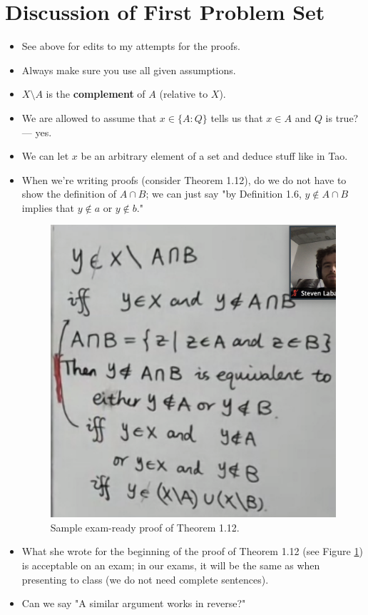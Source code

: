 \documentclass[titlepage]{article}
\theoremstyle{definition}
\begin{document}
\section{Discussion of First Problem Set}
\begin{itemize}
    \item {}See above for edits to my attempts for the proofs.
    \item Always make sure you use all given assumptions.
    \item $X\setminus A$ is the \textbf{complement} of $A$ (relative to $X$).
    \item We are allowed to assume that $x\in\{A:Q\}$ tells us that $x\in A$ and $Q$ is true? --- yes.
    \item We can let $x$ be an arbitrary element of a set and deduce stuff like in Tao.
    \item When we're writing proofs (consider Theorem 1.12), do we do not have to show the definition of $A\cap B$; we can just say "by Definition 1.6, $y\notin A\cap B$ implies that $y\notin a$ or $y\notin b$."
    \begin{figure}[h!]
        \centering
        \includegraphics[width=0.3\linewidth]{ExtFiles/SampleTrm1-12Proof.png}
        \caption{Sample exam-ready proof of Theorem 1.12.}
        \label{fig:sampleTrm1-12Proof}
    \end{figure}
    \item What she wrote for the beginning of the proof of Theorem 1.12 (see Figure \ref{fig:sampleTrm1-12Proof}) is acceptable on an exam; in our exams, it will be the same as when presenting to class (we do not need complete sentences).
    \item Can we say "A similar argument works in reverse?"
\end{itemize}
\end{document}
